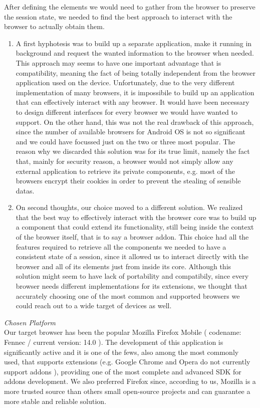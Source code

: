 \documentclass[11pt,a4paper]{article}
\begin{document}
After defining the elements we would need to gather from the browser to preserve the session state, we needed to find the best approach to interact with the browser to actually obtain them.
\begin{enumerate}
\item A first hyphotesis was to build up a separate application, make it running in background and request the wanted information to the browser when needed. This approach may seems to have one important advantage that is compatibility, meaning the fact of being totally independent from the browser application used on the device. Unfortunately, due to the very different implementation of many browsers, it is impossibile to build up an application that can effectively interact with any browser. It would have been necessary to design different interfaces for every browser we would have wanted to support. On the other hand, this was not the real drawback of this approach, since the number of available browsers for Android OS is not so significant and we could have focussed just on the two or three most popular. The reason why we discarded this solution was for its true limit, namely the fact that, mainly for security reason, a browser would not simply allow any external application to retrieve its private components, e.g. most of the browsers encrypt their cookies in order to prevent the stealing of sensible datas. 

\item On second thoughts, our choice moved to a different solution. We realized that the best way to effectively interact with the browser core was to build up a component that could extend its functionality, still being inside the context of the browser itself, that is to say a browser addon. This choice had all the features required to retrieve all the components we needed to have a consistent state of a session, since it allowed us to interact directly with the browser and all of its elements just from inside its core. Although this solution might seem to have lack of portability and compatibily, since every browser needs different implementations for its extensions, we thought that accurately choosing one of the most common and supported browsers we could reach out to a wide target of devices as well.
\end{enumerate}
\textit{Chosen Platform}\\
Our target browser has been the popular Mozilla Firefox Mobile ( codename: Fennec / current version: 14.0 ).  The development of this application is significantly active and it is one of the fews, also among the most commonly used,  that supports extensions (e.g. Google Chrome and Opera do not currently support addons ), providing one of the most complete and advanced SDK for addons development. We also preferred Firefox since, according to us, Mozilla is a more trusted source than others small open-source projects and can guarantee a more stable and reliable solution.
\end{document}
